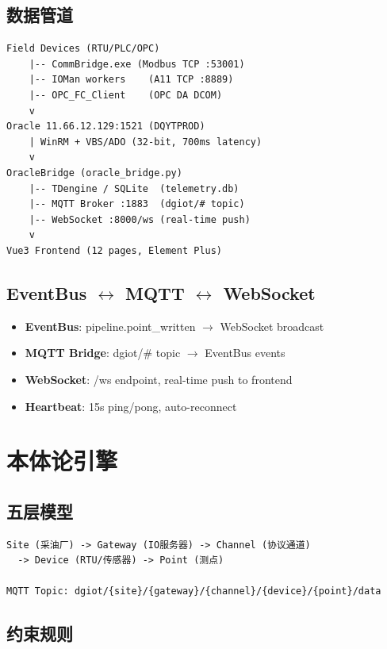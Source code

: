 \documentclass[12pt,a4paper]{ctexart}
\begin{document}
\subsection{数据管道}

\begin{lstlisting}[caption=数据流 Architecture]
Field Devices (RTU/PLC/OPC)
    |-- CommBridge.exe (Modbus TCP :53001)
    |-- IOMan workers    (A11 TCP :8889)
    |-- OPC_FC_Client    (OPC DA DCOM)
    v
Oracle 11.66.12.129:1521 (DQYTPROD)
    | WinRM + VBS/ADO (32-bit, 700ms latency)
    v
OracleBridge (oracle_bridge.py)
    |-- TDengine / SQLite  (telemetry.db)
    |-- MQTT Broker :1883  (dgiot/# topic)
    |-- WebSocket :8000/ws (real-time push)
    v
Vue3 Frontend (12 pages, Element Plus)
\end{lstlisting}

\subsection{EventBus $\leftrightarrow$ MQTT $\leftrightarrow$ WebSocket}

\begin{itemize}[leftmargin=*]
  \item \textbf{EventBus}: pipeline.point\_written $\rightarrow$ WebSocket broadcast
  \item \textbf{MQTT Bridge}: dgiot/\# topic $\rightarrow$ EventBus events
  \item \textbf{WebSocket}: /ws endpoint, real-time push to frontend
  \item \textbf{Heartbeat}: 15s ping/pong, auto-reconnect
\end{itemize}

\section{本体论引擎}

\subsection{五层模型}

\begin{lstlisting}[caption=Ontology 5-layer Model]
Site (采油厂) -> Gateway (IO服务器) -> Channel (协议通道)
  -> Device (RTU/传感器) -> Point (测点)

MQTT Topic: dgiot/{site}/{gateway}/{channel}/{device}/{point}/data
\end{lstlisting}

\subsection{约束规则}
\end{document}
